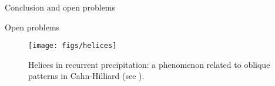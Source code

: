 \documentclass[final]{beamer}
\newlength{\onecolwid}
\begin{document}
\begin{frame}[t]
\begin{columns}[t]
\begin{column}{\onecolwid}
\begin{block}{Conclusion and open problems}
\begin{alertblock}{Open problems}
\end{alertblock}
\begin{figure}
\texttt{[image: figs/helices]}
\caption{Helices in recurrent precipitation: a phenomenon related to oblique patterns in Cahn-Hilliard (see \cite{thomas2013helices}).}
\label{helices}
\end{figure}
%  

\end{block}
\end{column}
\end{columns}
\end{frame}
\end{document}
